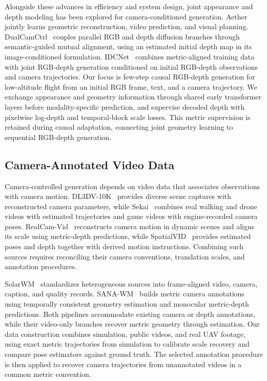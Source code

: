 Alongside these advances in efficiency and system design, joint appearance and depth modeling has been explored for camera-conditioned generation.
Aether~\cite{zhu2025aethergeometricawareunifiedworld} jointly learns geometric reconstruction, video prediction, and visual planning.
DualCamCtrl~\cite{zhang2025dualcamctrldualbranchdiffusionmodel} couples parallel RGB and depth diffusion branches through semantic-guided mutual alignment, using an estimated initial depth map in its image-conditioned formulation.
IDCNet~\cite{liu2025idcnetguidedvideodiffusion} combines metric-aligned training data with joint RGB-depth generation conditioned on initial RGB-depth observations and camera trajectories.
Our focus is few-step causal RGB-depth generation for low-altitude flight from an initial RGB frame, text, and a camera trajectory.
We exchange appearance and geometry information through shared early transformer layers before modality-specific prediction, and supervise decoded depth with pixelwise log-depth and temporal-block scale losses.
This metric supervision is retained during causal adaptation, connecting joint geometry learning to sequential RGB-depth generation.

\subsection{Camera-Annotated Video Data}
\label{sec:rw_camera_data}

Camera-controlled generation depends on video data that associates observations with camera motion.
DL3DV-10K~\cite{ling2024dl3dv10klargescalescenedataset} provides diverse scene captures with reconstructed camera parameters, while Sekai~\cite{li2025sekaivideodatasetworld} combines real walking and drone videos with estimated trajectories and game videos with engine-recorded camera poses.
RealCam-Vid~\cite{zheng2025realcamvidhighresolutionvideodataset} reconstructs camera motion in dynamic scenes and aligns its scale using metric-depth predictions, while SpatialVID~\cite{wang2025spatialvidlargescalevideodataset} provides estimated poses and depth together with derived motion instructions.
Combining such sources requires reconciling their camera conventions, translation scales, and annotation procedures.

SolarWM~\cite{huang2026solarwmopendatascalable} standardizes heterogeneous sources into frame-aligned video, camera, caption, and quality records.
SANA-WM~\cite{zhu2026sanawmefficientminutescaleworld} builds metric camera annotations using temporally consistent geometry estimation and monocular metric-depth predictions.
Both pipelines accommodate existing camera or depth annotations, while their video-only branches recover metric geometry through estimation.
Our data construction combines simulation, public videos, and real UAV footage, using exact metric trajectories from simulation to calibrate scale recovery and compare pose estimators against ground truth.
The selected annotation procedure is then applied to recover camera trajectories from unannotated videos in a common metric convention.

